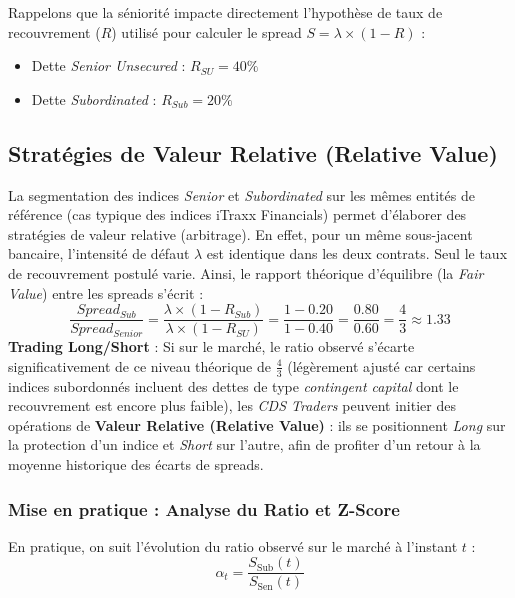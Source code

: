 \begin{remarque}
Rappelons que la séniorité impacte directement l'hypothèse de taux de recouvrement ($R$) utilisé pour calculer le spread $S = \lambda \times (1-R)$ :
\begin{itemize}
    \item Dette \textit{Senior Unsecured} : $R_{SU} = 40\%$
    \item Dette \textit{Subordinated} : $R_{Sub} = 20\%$
\end{itemize}
\end{remarque}

\subsection{Stratégies de Valeur Relative (Relative Value)}

La segmentation des indices \textit{Senior} et \textit{Subordinated} sur les mêmes entités de référence (cas typique des indices iTraxx Financials) permet d'élaborer des stratégies de valeur relative (arbitrage). En effet, pour un même sous-jacent bancaire, l'intensité de défaut $\lambda$ est identique dans les deux contrats. Seul le taux de recouvrement postulé varie.
Ainsi, le rapport théorique d'équilibre (la \textit{Fair Value}) entre les spreads s'écrit :
\begin{equation}
    \frac{Spread_{Sub}}{Spread_{Senior}} = \frac{\lambda \times (1 - R_{Sub})}{\lambda \times (1 - R_{SU})} = \frac{1 - 0.20}{1 - 0.40} = \frac{0.80}{0.60} = \frac{4}{3} \approx 1.33
\end{equation}
\textbf{Trading Long/Short} : Si sur le marché, le ratio observé s'écarte significativement de ce niveau théorique de $\frac{4}{3}$ (légèrement ajusté car certains indices subordonnés incluent des dettes de type \textit{contingent capital} dont le recouvrement est encore plus faible), les \textit{CDS Traders} peuvent initier des opérations de \textbf{Valeur Relative (Relative Value)} : ils se positionnent \textit{Long} sur la protection d'un indice et \textit{Short} sur l'autre, afin de profiter d'un retour à la moyenne historique des écarts de spreads.

\subsubsection{Mise en pratique : Analyse du Ratio et Z-Score}

En pratique, on suit l'évolution du ratio observé sur le marché à l'instant $t$ :
\begin{equation}
    \alpha_t = \frac{S_{\text{Sub}}(t)}{S_{\text{Sen}}(t)}
\end{equation}

